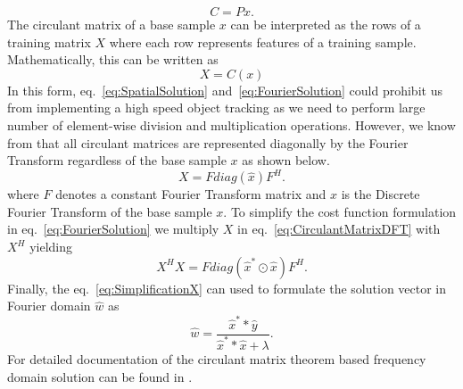 \documentclass[10pt,twocolumn,letterpaper]{article}
\newcounter{ct}
\begin{document}
\begin{equation}
C = Px.
\label{eq:CirculantMatrixGeneration}
\end{equation}
The circulant matrix of a base sample $x$ can be interpreted as the rows of a training matrix $X$ where each row represents features of a training sample. Mathematically, this can be written as
\begin{equation}
X = C(x)
\label{eq:CIrculantMatrixTrainingData}
\end{equation}
In this form, eq.~\ref{eq:SpatialSolution} and~\ref{eq:FourierSolution} could prohibit us from implementing a high speed object tracking as we need to perform large number of element-wise division and multiplication operations. However, we know from \cite{gray2006toeplitz} that all circulant matrices are represented diagonally by the Fourier Transform regardless of the base sample $x$ as shown below.
\begin{equation}
X = Fdiag(\hat{x})F^{H}.
\label{eq:CirculantMatrixDFT}
\end{equation}
where $F$ denotes a constant Fourier Transform matrix and $x$ is the Discrete Fourier Transform of the base sample $x$. To simplify the cost function formulation in eq.~\ref{eq:FourierSolution} we multiply $X$ in eq.~\ref{eq:CirculantMatrixDFT} with $X^{H}$ yielding 
\begin{equation}
X^{H}X = Fdiag(\hat{x}^{*}\odot \hat{x})F^{H}.
\label{eq:SimplificationX} 
\end{equation}
Finally, the eq.~\ref{eq:SimplificationX} can used to formulate the solution vector in Fourier domain $\hat{w}$ as
\begin{equation}
\hat{w} = \dfrac{\hat{x}^{*}*\hat{y}}{\hat{x}^{*}*\hat{x}+\lambda}.
\label{eq:DiagonalizedPrimalSolution}
\end{equation}
For detailed documentation of the circulant matrix theorem based frequency domain solution can be found in \cite{henriques2012exploiting,henriques2015high}.
\end{document}
